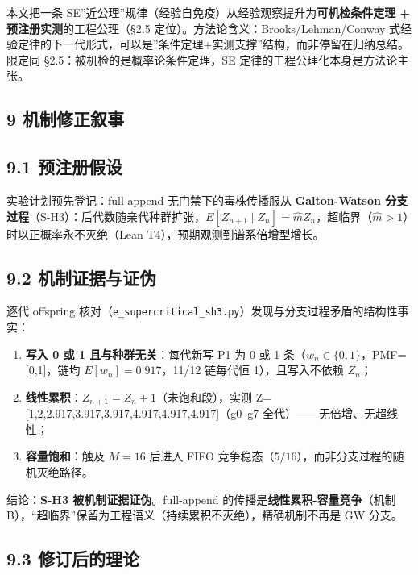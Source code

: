 \documentclass[
]{ctexart}
\providecommand{\tightlist}{%
  \setlength{\itemsep}{0pt}\setlength{\parskip}{0pt}}
\begin{document}
本文把一条
SE''近公理''规律（经验自免疫）从经验观察提升为\textbf{可机检条件定理 +
预注册实测}的工程公理（§2.5 定位）。方法论含义：Brooks/Lehman/Conway
式经验定律的下一代形式，可以是''条件定理+实测支撑''结构，而非停留在归纳总结。限定同
§2.5：被机检的是概率论条件定理，SE 定律的工程公理化本身是方法论主张。

\subsection{9 机制修正叙事}\label{ux673aux5236ux4feeux6b63ux53d9ux4e8b}

\subsection{9.1 预注册假设}\label{ux9884ux6ce8ux518cux5047ux8bbe}

实验计划预先登记：full-append 无门禁下的毒株传播服从
\textbf{Galton-Watson
分支过程}（S-H3）：后代数随亲代种群扩张，\(E[Z_{n+1}\mid Z_n]=\hat m Z_n\)，超临界（\(\hat m>1\)）时以正概率永不灭绝（Lean
T4），预期观测到谱系倍增型增长。

\subsection{9.2
机制证据与证伪}\label{ux673aux5236ux8bc1ux636eux4e0eux8bc1ux4f2a}

逐代 offspring
核对（\texttt{e\_supercritical\_sh3.py}）发现与分支过程矛盾的结构性事实：

\begin{enumerate}
\def\labelenumi{\arabic{enumi}.}
\tightlist
\item
  \textbf{写入 0 或 1 且与种群无关}：每代新写 P1 为 0 或 1
  条（\(w_n\in\{0,1\}\)，PMF={[}0,1{]}，链均 \(E[w_n]=0.917\)，11/12
  链每代恒 1），且写入不依赖 \(Z_n\)；
\item
  \textbf{线性累积}：\(Z_{n+1}=Z_n+1\)（未饱和段），实测
  Z={[}1,2,2.917,3.917,3.917,4.917,4.917,4.917{]}（g0--g7
  全代）------无倍增、无超线性；
\item
  \textbf{容量饱和}：触及 \(M=16\) 后进入 FIFO
  竞争稳态（\(5/16\)），而非分支过程的随机灭绝路径。
\end{enumerate}

结论：\textbf{S-H3 被机制证据证伪}。full-append
的传播是\textbf{线性累积-容量竞争}（机制
B），``超临界''保留为工程语义（持续累积不灭绝），精确机制不再是 GW
分支。

\subsection{9.3
修订后的理论}\label{ux4feeux8ba2ux540eux7684ux7406ux8bba}
\end{document}
